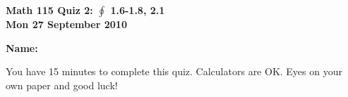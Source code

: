 \documentclass[11pt,letterpaper]{article}
\begin{document}
\flushleft
\begin{multicols}{2}


\begin{large}\textbf{Math 115 Quiz 2: $\oint $ 1.6-1.8, 2.1 \\
Mon 27 September 2010}\end{large}

\textbf{Name:  }\underline{\hspace{35ex}}

\vspace{.5in}

\end{multicols}

\pagestyle{empty}


\flushleft

You have 15 minutes to complete this quiz.  Calculators are OK.  Eyes on your own paper and good luck!
\end{document}
